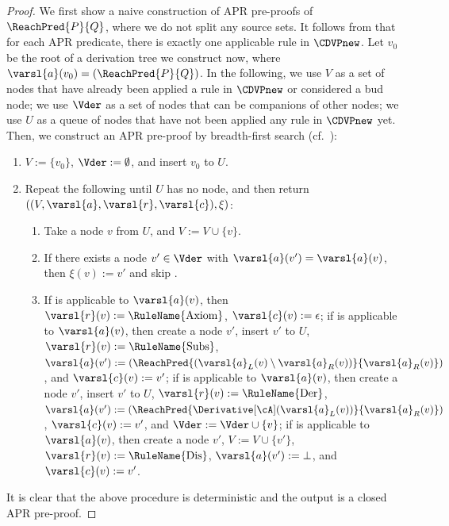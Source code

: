 \ThmFinitenessAndDecidabilityOfAPRPredicate*
\begin{proof}
	We first show a naive construction of APR pre-proofs of $\ReachPred{P}{Q}$, where we do not split any source sets.
	It follows from  that for each APR predicate, there is exactly one applicable rule in $\CDVPnew$.
	Let $v_0$ be the root of a derivation tree we construct now, where $\varsl{a}(v_0) = (\ReachPred{P}{Q})$.
	In the following, we use $V$ as a set of nodes that have already been applied a rule in $\CDVPnew$ or considered a bud node;
	we use $\Vder$ as a set of nodes that can be companions of other nodes;
	we use $U$ as a queue of nodes that have not been applied any rule in $\CDVPnew$ yet.
	Then, we construct an APR pre-proof by breadth-first search (cf.~\cite{KN24jip}):
	\begin{enumerate}
		\item $V := \{v_0\}$, $\Vder := \emptyset$, and insert $v_0$ to $U$.
		\item Repeat the following until $U$ has no node, and then return $((V,\varsl{a},\varsl{r},\varsl{c}),\xi)$:
		      \begin{enumerate}
			      \item Take a node $v$ from $U$, and $V := V \cup \{ v \}$.
			      \item If there exists a node $v' \in \Vder$ with $\varsl{a}(v') = \varsl{a}(v)$,
			            then $\xi(v) := v'$ and skip .
			      \item If  is applicable to $\varsl{a}(v)$,
			            then
			            $\varsl{r}(v) := \mbox{\RuleName{Axiom}}$, $\varsl{c}(v) := \epsilon$;
			            if  is applicable to $\varsl{a}(v)$,
			            then
			            create a node $v'$, insert $v'$ to $U$, $\varsl{r}(v) := \mbox{\RuleName{Subs}}$,
			            $\varsl{a}(v') := (\ReachPred{(\varsl{a}_L(v)\setminus\varsl{a}_R(v))}{\varsl{a}_R(v)})$,
			            and
			            $\varsl{c}(v) := v'$;
			            if  is applicable to $\varsl{a}(v)$,
			            then
			            create a node $v'$, insert $v'$ to $U$, $\varsl{r}(v) := \mbox{\RuleName{Der}}$,
			            $\varsl{a}(v') := (\ReachPred{\Derivative[\cA](\varsl{a}_L(v))}{\varsl{a}_R(v)})$,
			            $\varsl{c}(v) := v'$,
			            and
			            $\Vder := \Vder \cup \{ v \}$;
			            if  is applicable to $\varsl{a}(v)$,
			            then
			            create a node $v'$, $V := V \cup \{ v' \}$, $\varsl{r}(v) := \mbox{\RuleName{Dis}}$,
			            $\varsl{a}(v') := \bot$,
			            and
			            $\varsl{c}(v) := v'$.
		      \end{enumerate}
	\end{enumerate}
	It is clear that the above procedure is deterministic and the output is a closed APR pre-proof.


\end{proof}
